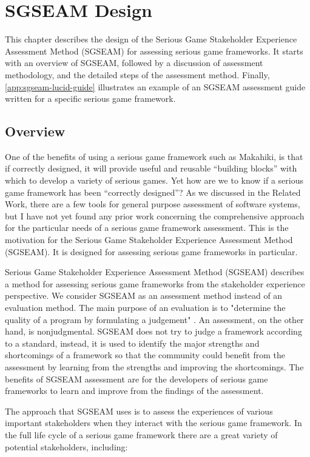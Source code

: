 \chapter{SGSEAM Design}
\label{cha:sgseam-design}

This chapter describes the design of the Serious Game Stakeholder Experience 
Assessment Method (SGSEAM) for assessing serious game frameworks. It starts with an overview of SGSEAM, followed by a discussion of assessment methodology, and the detailed steps of the assessment method. Finally, \autoref {app:sgseam-lucid-guide} illustrates an example of an SGSEAM assessment guide written for a specific serious game framework.

\section{Overview}

One of the benefits of using a serious game framework such as Makahiki, is that if correctly designed, it will provide useful and reusable ``building blocks'' with which to develop a variety of serious games. Yet how are we to know if a serious game framework has been ``correctly designed''? As we discussed in the Related Work, there are a few tools for general purpose assessment of software systems, but I have not yet found any prior work concerning the comprehensive approach for the particular needs of a serious game framework assessment. This is the motivation for the Serious Game Stakeholder Experience 
Assessment Method (SGSEAM). It is designed for assessing serious game frameworks in particular.

Serious Game Stakeholder Experience Assessment Method (SGSEAM) describes a method for 
assessing serious game frameworks from the stakeholder 
experience perspective.  We consider
SGSEAM as an assessment method instead of an evaluation method. The main purpose of an
evaluation is to "determine the quality of a program by formulating a judgement"
\cite{hurteau2009legitimate}. An assessment, on the other hand, is nonjudgmental. SGSEAM does
not try to judge a framework according to a standard, instead, it is used to identify the major
strengths and shortcomings of a framework so that the community could benefit from the
assessment by learning from the strengths and improving the shortcomings.
The benefits of SGSEAM assessment are for the developers of serious game frameworks 
to learn and improve from the findings of the assessment.

The approach that SGSEAM uses is to assess the experiences of various important stakeholders when
they interact with the serious game framework. In the full life cycle of a serious game framework
there are a great variety of potential stakeholders, including:

